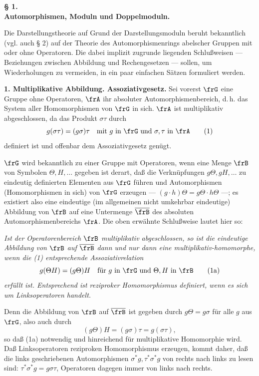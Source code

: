 \begin{center}
\textbf{§ 1.}\\[0.4em]
\textbf{Automorphismen, Moduln und Doppelmoduln.}
\end{center}

Die Darstellungstheorie auf Grund der Darstellungsmoduln beruht bekanntlich (vgl. auch § 2) auf der Theorie des Automorphismenrings abelscher Gruppen mit oder ohne Operatoren. Die dabei implizit zugrunde liegenden Schlußweisen --- Beziehungen zwischen Abbildung und Rechengesetzen --- sollen, um Wiederholungen zu vermeiden, in ein paar einfachen Sätzen formuliert werden.

\noindent\textbf{1. Multiplikative Abbildung. Assoziativgesetz.} Sei vorerst \(\frG\) eine Gruppe ohne Operatoren, \(\frA\) ihr absoluter Automorphismenbereich, d.\,h. das System aller Homomorphismen von \(\frG\) in sich. \(\frA\) ist multiplikativ abgeschlossen, da das Produkt \( \sigma\tau \) durch
\[
        g(\sigma\tau)=(g\sigma)\tau
        \quad \text{mit } g \text{ in } \frG \text{ und } \sigma,\tau \text{ in } \frA                         \tag{1}
\]
definiert ist und offenbar dem Assoziativgesetz genügt.

\(\frG\) wird bekanntlich zu einer Gruppe mit Operatoren, wenn eine Menge \(\frB\) von Symbolen \(\Theta,H,\ldots\) gegeben ist derart, daß die Verknüpfungen \(g\Theta,gH,\ldots\) zu eindeutig definierten Elementen aus \(\frG\) führen und Automorphismen (Homomorphismen in sich) von \(\frG\) erzeugen --- \((g\cdot h)\Theta=g\Theta\cdot h\Theta\) ---; es existiert also eine eindeutige (im allgemeinen nicht umkehrbar eindeutige) Abbildung von \(\frB\) auf eine Untermenge \(\overline{\frB}\) des absoluten Automorphismenbereichs \(\frA\). Die oben erwähnte Schlußweise lautet hier so:

\emph{Ist der Operatorenbereich \(\frB\) multiplikativ abgeschlossen, so ist die eindeutige Abbildung von \(\frB\) auf \(\overline{\frB}\) dann und nur dann eine multiplikativ-homomorphe, wenn die (1) entsprechende Assoziativrelation}
\[
        g(\Theta H)=(g\Theta)H
        \quad \text{für } g \text{ in } \frG \text{ und } \Theta,H \text{ in } \frB                         \tag{1a}
\]
\emph{erfüllt ist. Entsprechend ist reziproker Homomorphismus definiert, wenn es sich um Linksoperatoren handelt.}

Denn die Abbildung von \(\frB\) auf \(\overline{\frB}\) ist gegeben durch \(g\Theta=g\sigma\) für alle \(g\) aus \(\frG\), also auch durch
\[
        (g\Theta)H=(g\sigma)\tau=g(\sigma\tau),
\]
so daß (1a) notwendig und hinreichend für multiplikative Homomorphie wird. Daß Linksoperatoren reziproken Homomorphismus erzeugen, kommt daher, daß die links geschriebenen Automorphismen \(\sigma^\ast g,\tau^\ast\sigma^\ast g\) von rechts nach links zu lesen sind: \(\tau^\ast\sigma^\ast g=g\sigma\tau\), Operatoren dagegen immer von links nach rechts.

